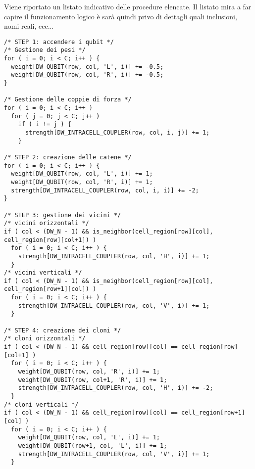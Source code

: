 Viene riportato un listato indicativo delle procedure elencate. Il listato mira a far capire il funzionamento logico è sarà quindi privo di dettagli quali inclusioni, nomi reali, ecc...
\lstset{language=C}
\begin{lstlisting}
/* STEP 1: accendere i qubit */
/* Gestione dei pesi */
for ( i = 0; i < C; i++ ) {
  weight[DW_QUBIT(row, col, 'L', i)] += -0.5;
  weight[DW_QUBIT(row, col, 'R', i)] += -0.5;
}

/* Gestione delle coppie di forza */
for ( i = 0; i < C; i++ )
  for ( j = 0; j < C; j++ )
    if ( i != j ) {
      strength[DW_INTRACELL_COUPLER(row, col, i, j)] += 1;
    }

/* STEP 2: creazione delle catene */
for ( i = 0; i < C; i++ ) {
  weight[DW_QUBIT(row, col, 'L', i)] += 1;
  weight[DW_QUBIT(row, col, 'R', i)] += 1;
  strength[DW_INTRACELL_COUPLER(row, col, i, i)] += -2;
}

/* STEP 3: gestione dei vicini */
/* vicini orizzontali */
if ( col < (DW_N - 1) && is_neighbor(cell_region[row][col], cell_region[row][col+1]) )
  for ( i = 0; i < C; i++ ) {
    strength[DW_INTRACELL_COUPLER(row, col, 'H', i)] += 1;
  }
/* vicini verticali */
if ( col < (DW_N - 1) && is_neighbor(cell_region[row][col], cell_region[row+1][col]) )
  for ( i = 0; i < C; i++ ) {
    strength[DW_INTRACELL_COUPLER(row, col, 'V', i)] += 1;
  }

/* STEP 4: creazione dei cloni */
/* cloni orizzontali */
if ( col < (DW_N - 1) && cell_region[row][col] == cell_region[row][col+1] )
  for ( i = 0; i < C; i++ ) {
    weight[DW_QUBIT(row, col, 'R', i)] += 1;
    weight[DW_QUBIT(row, col+1, 'R', i)] += 1;
    strength[DW_INTRACELL_COUPLER(row, col, 'H', i)] += -2;
  }
/* cloni verticali */
if ( col < (DW_N - 1) && cell_region[row][col] == cell_region[row+1][col] )
  for ( i = 0; i < C; i++ ) {
    weight[DW_QUBIT(row, col, 'L', i)] += 1;
    weight[DW_QUBIT(row+1, col, 'L', i)] += 1;
    strength[DW_INTRACELL_COUPLER(row, col, 'V', i)] += 1;
  }
\end{lstlisting}
